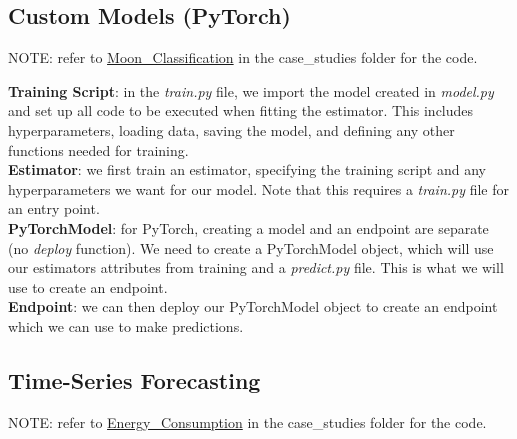 \documentclass[11pt, a4paper]{article}
\begin{document}
\begin{spacing}{1.1}
	\subsection{Custom Models (PyTorch)}
	\begin{center}
	\color{darkgray} NOTE: refer to \href{file:///E:/Documents/UdacityNotes/ML\%20Engineer/sample_code/case_studies/Moon_Classification.html}{Moon\_Classification} in the case\_studies folder for the code. \color{black}
	\end{center}
	\textbf{Training Script}: in the \textit{train.py} file, we import the model created in \textit{model.py} and set up all code to be executed when fitting the estimator. This includes hyperparameters, loading data, saving the model, and defining any other functions needed for training. \vspace*{2mm}\\
	\textbf{Estimator}: we first train an estimator, specifying the training script and any hyperparameters we want for our model. Note that this requires a \textit{train.py} file for an entry point. \vspace*{2mm}\\
	\textbf{PyTorchModel}: for PyTorch, creating a model and an endpoint are separate (no \textit{deploy} function). We need to create a PyTorchModel object, which will use our estimators attributes from training and a \textit{predict.py} file. This is what we will use to create an endpoint.\vspace*{2mm}\\
	\textbf{Endpoint}: we can then deploy our PyTorchModel object to create an endpoint which we can use to make predictions.\vspace*{2mm}
	
	\subsection{Time-Series Forecasting}
	\begin{center}
	\color{darkgray} NOTE: refer to \href{...}{Energy\_Consumption} in the case\_studies folder for the code. \color{black}
	\end{center}
	
	
	
	
	
	
	
	
	
	
	
	
\end{spacing}
\end{document}
